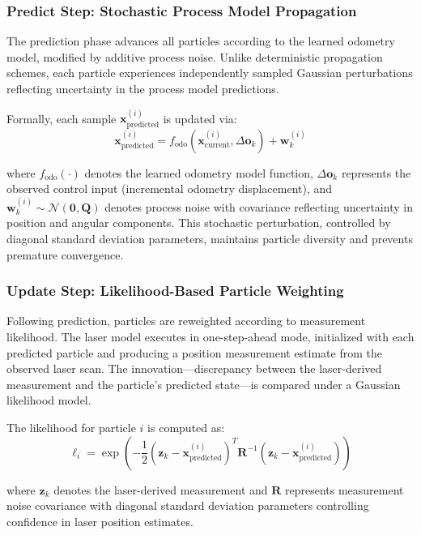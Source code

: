 \documentclass[conference]{IEEEtran}
\begin{document}
\subsubsection{Predict Step: Stochastic Process Model Propagation}

The prediction phase advances all particles according to the learned odometry model, modified by additive process noise. Unlike deterministic propagation schemes, each particle experiences independently sampled Gaussian perturbations reflecting uncertainty in the process model predictions.

Formally, each sample $\mathbf{x}^{(i)}_{\text{predicted}}$ is updated via:
\begin{equation}
    \mathbf{x}^{(i)}_{\text{predicted}} = f_{\text{odo}}(\mathbf{x}^{(i)}_{\text{current}}, \Delta \mathbf{o}_k) + \mathbf{w}_k^{(i)}
\end{equation}

where $f_{\text{odo}}(\cdot)$ denotes the learned odometry model function, $\Delta \mathbf{o}_k$ represents the observed control input (incremental odometry displacement), and $\mathbf{w}_k^{(i)} \sim \mathcal{N}(\mathbf{0}, \mathbf{Q})$ denotes process noise with covariance reflecting uncertainty in position and angular components. This stochastic perturbation, controlled by diagonal standard deviation parameters, maintains particle diversity and prevents premature convergence.

\subsubsection{Update Step: Likelihood-Based Particle Weighting}

Following prediction, particles are reweighted according to measurement likelihood. The laser model executes in one-step-ahead mode, initialized with each predicted particle and producing a position measurement estimate from the observed laser scan. The innovation—discrepancy between the laser-derived measurement and the particle's predicted state—is compared under a Gaussian likelihood model.

The likelihood for particle $i$ is computed as:
\begin{equation}
    \ell_i = \exp\left(-\frac{1}{2} (\mathbf{z}_k - \mathbf{x}^{(i)}_{\text{predicted}})^T \mathbf{R}^{-1} (\mathbf{z}_k - \mathbf{x}^{(i)}_{\text{predicted}})\right)
\end{equation}

where $\mathbf{z}_k$ denotes the laser-derived measurement and $\mathbf{R}$ represents measurement noise covariance with diagonal standard deviation parameters controlling confidence in laser position estimates.
\end{document}
